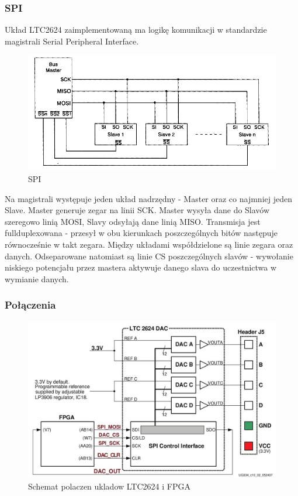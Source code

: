 \documentclass[a4paper,12pt]{article}
\begin{document}
\subsubsection{SPI}
Układ LTC2624 zaimplementowaną ma logikę komunikacji w standardzie magistrali Serial Peripheral Interface.

\begin{figure}[htb]
   \centering
   \includegraphics[width=15cm]{grafika/spi.jpg}
   \caption{SPI}
\end{figure}

Na magistrali występuje jeden układ nadrzędny - Master oraz co najmniej jeden Slave.
Master generuje zegar na linii SCK.
Master wysyła dane do Slavów szeregowo linią MOSI, Slavy odsyłają dane linią MISO. Transmisja jest fullduplexowana - przesył w obu kierunkach poszczególnych bitów następuje równocześnie w takt zegara.
Między układami współdzielone są linie zegara oraz danych. Odseparowane natomiast są linie CS poszczególnych slavów - wywołanie niskiego potencjału przez mastera aktywuje danego slava do uczestnictwa w wymianie danych.


\newpage
\subsubsection{Połączenia}

\begin{figure}[htb]
   \centering
   \includegraphics[width=15cm]{grafika/dac.jpg}
   \caption{Schemat polaczen ukladow LTC2624 i FPGA}
\end{figure}
\end{document}
